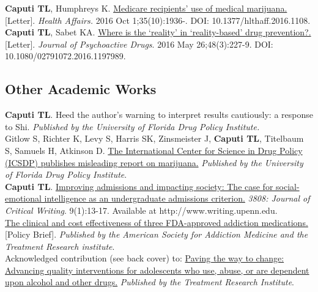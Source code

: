 \documentclass[11pt, letterpaper]{article}
\newcommand{\years}[1]{\marginnote{\normalsize #1}}
\begin{document}
\years{2016}\textbf{Caputi TL}, Humphreys K. \href{http://dx.doi.org/10.1377/hlthaff.2016.1108}{Medicare recipients’ use of medical marijuana.} [Letter]. \textit{Health Affairs.} 2016 Oct 1;35(10):1936-. DOI: 10.1377/hlthaff.2016.1108.\\[.2cm]
\years{2016}\textbf{Caputi TL}, Sabet KA. \href{http://dx.doi.org/10.1080/02791072.2016.1197989}{Where is the ‘reality’ in ‘reality-based’ drug prevention?.} [Letter]. \textit{Journal of Psychoactive Drugs}. 2016 May 26;48(3):227-9. DOI: 10.1080/02791072.2016.1197989.\\[.2cm]


\subsection*{Other Academic Works}
\noindent
\years{2017}\textbf{Caputi TL}. Heed the author’s warning to interpret results cautiously: a response to Shi. \emph{Published by the University of Florida Drug Policy Institute.}\\[.2cm]
\years{2015}Gitlow S, Richter K, Levy S, Harris SK, Zinsmeister J, \textbf{Caputi TL}, Titelbaum S, Samuels H, Atkinson D.  \href{https://www.academia.edu/16576576/The_International_Centre_for_Science_in_Drug_Policy_ICSDP_Publishes_Misleading_Report_on_Marijuana}{The International Center for Science in Drug Policy (ICSDP) publishes misleading report on marijuana.} \textit{Published by the University of Florida Drug Policy Institute}.\\ [.2cm]
\years{2015}\textbf{Caputi TL}. \href{http://www.writing.upenn.edu/critical/opportunities/3808/pdf/3808_fall_2015.pdf#page=13}{Improving admissions and impacting society: The case for social-emotional intelligence as an undergraduate admissions criterion.} \textit{3808: Journal of Critical Writing}. 9(1):13-17. Available at
http://www.writing.upenn.edu.\\[.2cm]
\years{2014}\href{https://web.archive.org/web/20170622171723/https://www.asam.org/docs/default-source/2015-conference-epk/asam-impact_cce-4-02-14.pdf?sfvrsn=4}{The clinical and cost effectiveness of three FDA-approved addiction medications.} [Policy Brief]. \textit{Published by the American Society for Addiction Medicine and the Treatment Research institute}. \\[.2cm]
\years{2014}Acknowledged contribution (see back cover) to: \href{https://issuu.com/tri_solutions/docs/tri_report_singlepages_highres}{Paving the way to change: Advancing quality interventions for adolescents who use, abuse, or are dependent upon alcohol and other drugs.} \textit{Published by the Treatment Research Institute}. \\[.2cm]
\end{document}
